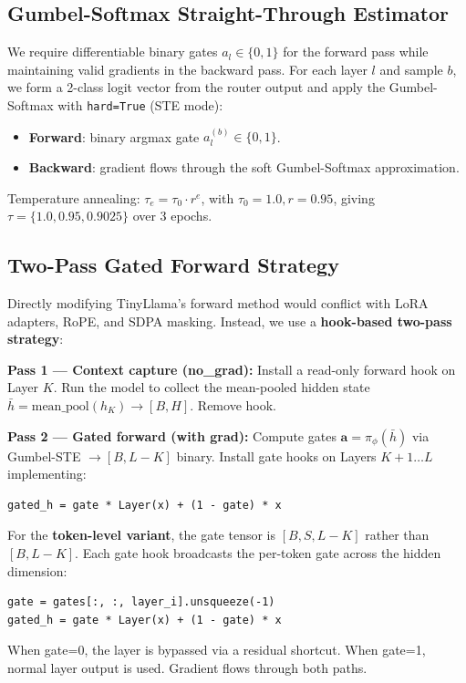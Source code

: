 \documentclass[conference]{IEEEtran}
\begin{document}
\subsection{Gumbel-Softmax Straight-Through Estimator}
We require differentiable binary gates $a_l \in \{0,1\}$ for the forward pass while maintaining valid gradients in the backward pass. For each layer $l$ and sample $b$, we form a 2-class logit vector from the router output and apply the Gumbel-Softmax with \texttt{hard=True} (STE mode):
\begin{itemize}
    \item \textbf{Forward}: binary argmax gate $a_l^{(b)} \in \{0,1\}$.
    \item \textbf{Backward}: gradient flows through the soft Gumbel-Softmax approximation.
\end{itemize}
Temperature annealing: $\tau_e = \tau_0 \cdot r^e$, with $\tau_0 = 1.0, r = 0.95$, giving $\tau = \{1.0, 0.95, 0.9025\}$ over 3 epochs.

\subsection{Two-Pass Gated Forward Strategy}
Directly modifying TinyLlama's forward method would conflict with LoRA adapters, RoPE, and SDPA masking. Instead, we use a \textbf{hook-based two-pass strategy}:

\textbf{Pass 1 --- Context capture (no\_grad):} Install a read-only forward hook on Layer $K$. Run the model to collect the mean-pooled hidden state $\bar{h} = \text{mean\_pool}(h_K) \to [B, H]$. Remove hook.

\textbf{Pass 2 --- Gated forward (with grad):} Compute gates $\mathbf{a} = \pi_\phi(\bar{h})$ via Gumbel-STE $\to [B, L-K]$ binary. Install gate hooks on Layers $K+1\dots L$ implementing:
\begin{verbatim}
gated_h = gate * Layer(x) + (1 - gate) * x
\end{verbatim}

For the \textbf{token-level variant}, the gate tensor is $[B, S, L-K]$ rather than $[B, L-K]$. Each gate hook broadcasts the per-token gate across the hidden dimension:
\begin{verbatim}
gate = gates[:, :, layer_i].unsqueeze(-1)
gated_h = gate * Layer(x) + (1 - gate) * x
\end{verbatim}

When gate=0, the layer is bypassed via a residual shortcut. When gate=1, normal layer output is used. Gradient flows through both paths.
\end{document}
